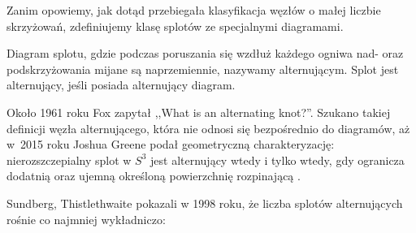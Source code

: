 Zanim opowiemy, jak dotąd przebiegała klasyfikacja węzłów o małej liczbie skrzyżowań, zdefiniujemy klasę splotów ze specjalnymi diagramami.

\begin{definition}[alternacja]
%
    Diagram splotu, gdzie podczas poruszania się wzdłuż każdego ogniwa nad- oraz podskrzyżowania mijane są naprzemiennie, nazywamy alternującym.
    Splot jest alternujący, jeśli posiada alternujący diagram.
\end{definition}

Około 1961 roku Fox zapytał ,,What is an alternating knot?''.
%
Szukano takiej definicji węzła alternującego, która nie odnosi się bezpośrednio do diagramów, aż w~2015 roku Joshua Greene podał geometryczną charakteryzację: nierozszczepialny splot w $S^3$ jest alternujący wtedy i tylko wtedy, gdy ogranicza dodatnią oraz ujemną określoną powierzchnię rozpinającą \cite{greene17}.
%

Sundberg, Thistlethwaite \cite{sundberg98} pokazali w 1998 roku, że liczba splotów alternujących rośnie co najmniej wykładniczo:
%
%

